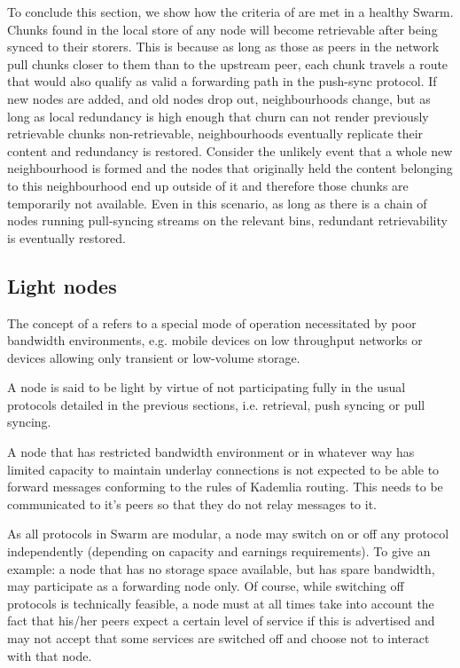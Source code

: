 To conclude this section, we show how the criteria of  are met in a healthy Swarm. Chunks found in the local store of any node will become retrievable after being synced to their storers. This is because as long as those as peers in the network pull chunks closer to them than to the upstream peer, each chunk travels a route that would also qualify as valid a forwarding path in the push-sync protocol. If new nodes are added, and old nodes drop out, neighbourhoods change, but as long as local redundancy is high enough that churn can not render previously retrievable chunks non-retrievable, neighbourhoods eventually replicate their content and redundancy is restored. Consider the unlikely event that a whole new neighbourhood is formed and the nodes that originally held the content belonging to this neighbourhood end up outside of it and therefore those chunks are temporarily not available. Even in this scenario, as long as there is a chain of nodes running pull-syncing streams on the relevant bins, redundant retrievability is eventually restored.

\subsection{Light nodes\statusgreen}
\label{sec:light}

The concept of a  refers to a special mode of operation necessitated by poor bandwidth environments, e.g. mobile devices on low throughput networks or devices allowing only transient or low-volume storage.

A node is said to be light by virtue of not participating fully in the usual protocols detailed in the previous sections, i.e. retrieval, push syncing or pull syncing. 

A node that has restricted bandwidth environment or in whatever way has limited capacity to maintain underlay connections is not expected to be able to forward messages conforming to the rules of Kademlia routing. This needs to be communicated to it's peers so that they do not relay messages to it. 

As all protocols in Swarm are modular, a node may switch on or off any protocol independently (depending on capacity and earnings requirements). To give an example: a node that has no storage space available, but has spare bandwidth, may participate as a forwarding node only. Of course, while switching off protocols is technically feasible, a node must at all times take into account the fact that his/her peers expect a certain level of service if this is advertised and may not accept that some services are switched off and choose not to interact with that node. 

